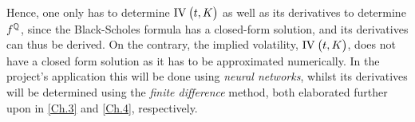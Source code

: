 Hence, one only has to determine $\IV{t,K}$ as well as its derivatives to determine $f^{\mathbb{Q}}$, since the Black-Scholes formula has a closed-form solution, and its derivatives can thus be derived. On the contrary, the implied volatility, $\IV{t,K}$, does not have a closed form solution as it has to be approximated numerically. In the project's application this will be done using \emph{neural networks}, whilst its derivatives will be determined using the \emph{finite difference} method, both elaborated further upon in \autoref{Ch.3} and \autoref{Ch.4}, respectively.